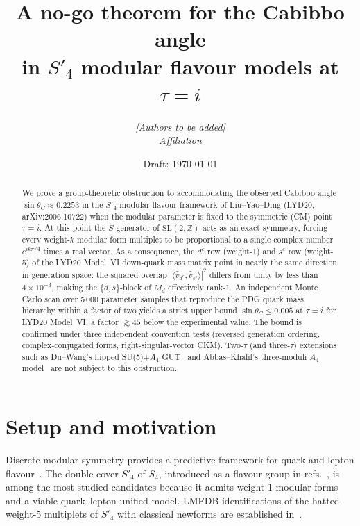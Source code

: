 \documentclass[a4paper,11pt]{article}
\title{A no-go theorem for the Cabibbo angle\\
       in $S'_4$ modular flavour models at $\tau=i$}
\author{%
  \textit{[Authors to be added]}%
  \\[2ex]
  \small\textit{Affiliation}
}
\date{Draft: \today}
\newcommand{\Spf}{S'_4}
\newcommand{\sinTC}{\sin\theta_C}
\newcommand{\Md}{M_d}
\begin{document}
\maketitle

\begin{abstract}
We prove a group-theoretic obstruction to accommodating the observed
Cabibbo angle $\sin\theta_C \approx 0.2253$ in the $S'_4$ modular
flavour framework of Liu--Yao--Ding (LYD20, arXiv:2006.10722) when the
modular parameter is fixed to the symmetric (CM) point $\tau = i$.
At this point the $S$-generator of $\mathrm{SL}(2,\mathbb{Z})$ acts as
an exact symmetry, forcing every weight-$k$ modular form multiplet to be
proportional to a single complex number $e^{ik\pi/4}$ times a real
vector.  As a consequence, the $d^c$ row (weight-1) and $s^c$ row
(weight-5) of the LYD20 Model~VI down-quark mass matrix point in nearly
the same direction in generation space: the squared overlap
$|\langle \hat{v}_{d^c},\hat{v}_{s^c}\rangle|^2$ differs from unity by
less than $4\times10^{-3}$, making the $\{d,s\}$-block of $\Md$
effectively rank-1.  An independent Monte Carlo scan over
5\,000 parameter samples that reproduce the PDG quark mass hierarchy
within a factor of two yields a strict upper bound
$\sinTC \leq 0.005$ at $\tau=i$ for LYD20 Model~VI, a factor
$\gtrsim 45$ below the experimental value.  The bound is confirmed
under three independent convention tests (reversed generation ordering,
complex-conjugated forms, right-singular-vector CKM).  Two-$\tau$ (and three-$\tau$) extensions such as Du--Wang's flipped
SU(5)+$A_4$ GUT~\cite{DuWang22} and Abbas--Khalil's three-moduli
$A_4$ model~\cite{AbbasKhalil22} are not subject to this
obstruction.
\end{abstract}

\section{Setup and motivation}
\label{sec:setup}

Discrete modular symmetry provides a predictive framework for quark
and lepton flavour~\cite{Feruglio2017}.  The double cover
$\Spf$ of $S_4$, introduced as a flavour group in
refs.~\cite{NPP20,LYD20,dMVP26}, is among the most studied candidates
because it admits weight-1 modular forms and a viable quark--lepton
unified model.  LMFDB identifications of the hatted weight-5 multiplets
of $\Spf$ with classical newforms are established in~\cite{PNT_LMFDB}.
\end{document}
